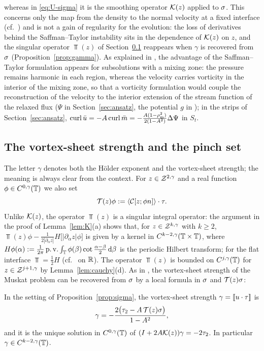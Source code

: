 \begin{remark}
whereas in \eqref{eq:U-sigma} it is the smoothing operator $\mathcal{K}(z)$ applied to $\sigma$. This concerns only the map from the density to the normal velocity at a fixed interface (cf.\
\cite[Prop.~8.3]{LM26}) and is not a gain of regularity for the evolution: the loss of derivatives behind the Saffman--Taylor instability sits in the dependence of $\mathcal{K}(z)$ on $z$, and the
singular operator $\Top(z)$ of Section~\ref{x:vortex-sheet} reappears when $\gamma$ is recovered from $\sigma$ (Proposition~\ref{prop:gamma}). As explained in \cite[Secs.~3.1.4 and~3.3.5]{LM26},
the advantage of the Saffman--Taylor formulation appears for subsolutions with a mixing zone: the pressure remains harmonic in each region, whereas the velocity carries vorticity in the
interior of the mixing zone, so that a vorticity formulation would couple the reconstruction of the velocity to the interior extension of the stream function of the relaxed flux ($\Psi$ in
Section~\ref{sec:ansatz}, the potential $g$ in \cite{LM26}); in the strips of Section~\ref{sec:ansatz}, $\operatorname{curl}\bar u=-A\operatorname{curl}\bar m=-\frac{A(1-\rho_{\mathrm m}^2)}{2(1-A^2)}\Delta\Psi$ in $S_t$.
\end{remark}

\subsection{The vortex-sheet strength and the pinch set}\label{x:vortex-sheet}
The letter $\gamma$ denotes both the H\"older exponent and the vortex-sheet strength; the meaning is always clear from the context.
For $z\in\mathcal{Z}^{2,\gamma}$ and a real function $\phi\in C^{0,\gamma}(\mathbb{T})$ we also set
\[
\mathcal{T}(z)\phi:=\langle \mathcal{C}[z;\phi n]\rangle\cdot\tau .
\]
Unlike $\mathcal{K}(z)$, the operator $\Top(z)$ is a singular integral operator: the argument in the proof of Lemma~\ref{lem:K}(a) shows that, for $z\in\mathcal{Z}^{k,\gamma}$ with $k\ge2$,
$\Top(z)\phi-\frac{1}{2|\partial_\alpha z|}H\big[|\partial_\alpha z|\phi\big]$ is given by a kernel in $C^{k-2,\gamma}(\mathbb{T}\times\mathbb{T})$, where
$H\phi(\alpha):=\frac1{2\pi}\operatorname{p.v.}\int_{\mathbb{T}}\phi(\beta)\cot\frac{\alpha-\beta}2\,\mathrm{d}\beta$ is the periodic Hilbert transform; for the flat interface $\Top=\frac12H$ (cf.\ \cite[(8.14)]{LM26} on $\mathbb{R}$).
The operator $\Top(z)$ is bounded on $C^{j,\gamma}(\mathbb{T})$ for $z\in\mathcal{Z}^{j+1,\gamma}$ by Lemma~\ref{lem:cauchy}(d). As in \cite[Sec.~3.1.3]{LM26}, the vortex-sheet strength of the Muskat
problem can be recovered from $\sigma$ by a local formula in $\sigma$ and $\mathcal{T}(z)\sigma$:

\begin{proposition}\label{prop:gamma}
In the setting of Proposition~\ref{prop:sigma}, the vortex-sheet strength $\gamma=[\![u\cdot\tau]\!]$ is
\begin{equation}\label{eq:gamma-sigma}
\gamma=-\frac{2\big(\tau_2-A\,\mathcal{T}(z)\sigma\big)}{1-A^2},
\end{equation}
and it is the unique solution in $C^{0,\gamma}(\mathbb{T})$ of $(I+2A\mathcal{K}(z))\gamma=-2\tau_2$. In particular $\gamma\in C^{k-2,\gamma}(\mathbb{T})$.
\end{proposition}

